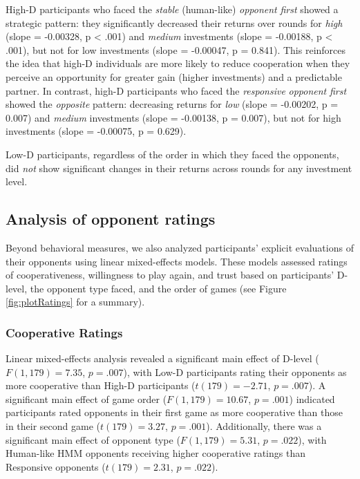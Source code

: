 \documentclass[
]{article}
\begin{document}
High-D participants who faced the \emph{stable} (human-like) \emph{opponent} \emph{first} showed a strategic pattern: they significantly decreased their returns over rounds for \emph{high} (slope = -0.00328, p \textless{} .001) and \emph{medium} investments (slope = -0.00188, p \textless{} .001), but not for low investments (slope = -0.00047, p = 0.841). This reinforces the idea that high-D individuals are more likely to reduce cooperation when they perceive an opportunity for greater gain (higher investments) and a predictable partner. In contrast, high-D participants who faced the \emph{responsive} \emph{opponent} \emph{first} showed the \emph{opposite} pattern: decreasing returns for \emph{low} (slope = -0.00202, p = 0.007) and \emph{medium} investments (slope = -0.00138, p = 0.007), but not for high investments (slope = -0.00075, p = 0.629).

Low-D participants, regardless of the order in which they faced the opponents, did \emph{not} show significant changes in their returns across rounds for any investment level.

\subsection{Analysis of opponent ratings}\label{analysis-of-opponent-ratings}

Beyond behavioral measures, we also analyzed participants' explicit evaluations of their opponents using linear mixed-effects models. These models assessed ratings of cooperativeness, willingness to play again, and trust based on participants' D-level, the opponent type faced, and the order of games (see Figure \ref{fig:plotRatings} for a summary).

\subsubsection{Cooperative Ratings}\label{cooperative-ratings}

Linear mixed-effects analysis revealed a significant main effect of D-level (\(F(1, 179) = 7.35\), \(p = .007\)), with Low-D participants rating their opponents as more cooperative than High-D participants (\(t(179) = -2.71\), \(p = .007\)). A significant main effect of game order (\(F(1, 179) = 10.67\), \(p = .001\)) indicated participants rated opponents in their first game as more cooperative than those in their second game (\(t(179) = 3.27\), \(p = .001\)). Additionally, there was a significant main effect of opponent type (\(F(1, 179) = 5.31\), \(p = .022\)), with Human-like HMM opponents receiving higher cooperative ratings than Responsive opponents (\(t(179) = 2.31\), \(p = .022\)).
\end{document}
